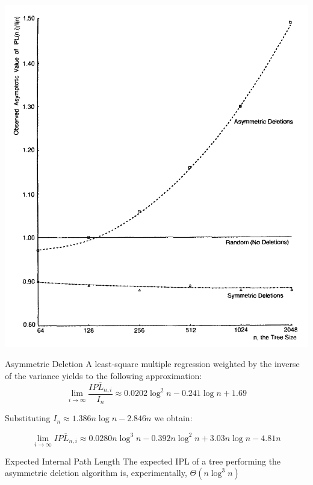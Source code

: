 \documentclass{beamer}
\begin{document}
\begin{frame}[plain]
    \begin{center}
        \includegraphics[width=\paperwidth,height=\paperheight,keepaspectratio]{asymp.png}
    \end{center}
\end{frame}



\begin{frame}{Asymmetric Deletion}
    A least-square multiple regression weighted by the inverse of the variance yields to the following approximation:
    \pause
    $$
    \lim_{i \to \infty} \frac{\overline{IPL_{n,i}}}{I_n} \approx 0.0202 \log^2 n - 0.241 \log n + 1.69
    $$

    Substituting $I_n \approx 1.386n \log n - 2.846n$ we obtain:
    \pause

    $$
    \lim_{i \to \infty} \overline{IPL_{n,i}} \approx 0.0280n \log^3 n - 0.392n \log^2 n + 3.03n \log n - 4.81n
    $$

    \pause
    \begin{block}{Expected Internal Path Length}
        The expected IPL of a tree performing the asymmetric deletion algorithm is, experimentally, $\Theta(n \log^3 n)$
    \end{block}
\end{frame}
\end{document}
